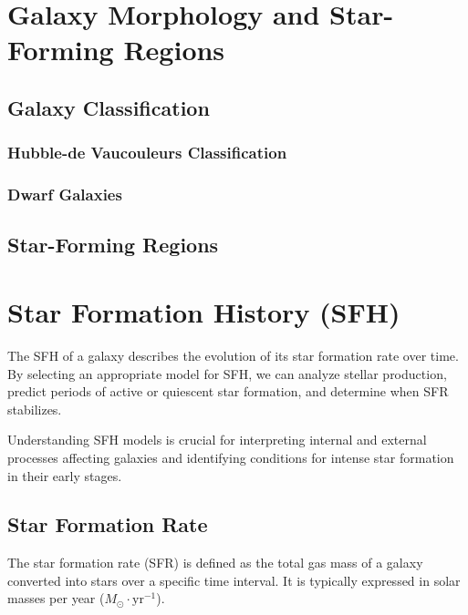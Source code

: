 \documentclass[
]{article}
\begin{document}
\newpage{}

\section{Galaxy Morphology and Star-Forming
Regions}\label{galaxy-morphology-and-star-forming-regions}

\subsection{Galaxy Classification}\label{galaxy-classification}

\subsubsection{Hubble-de Vaucouleurs
Classification}\label{hubble-de-vaucouleurs-classification}

\subsubsection{Dwarf Galaxies}\label{dwarf-galaxies}

\subsection{Star-Forming Regions}\label{star-forming-regions}

\section{Star Formation History (SFH)}\label{star-formation-history-sfh}

The SFH of a galaxy describes the evolution of its star formation rate
over time. By selecting an appropriate model for SFH, we can analyze
stellar production, predict periods of active or quiescent star
formation, and determine when SFR stabilizes.

Understanding SFH models is crucial for interpreting internal and
external processes affecting galaxies and identifying conditions for
intense star formation in their early stages.

\subsection{Star Formation Rate}\label{star-formation-rate}

The star formation rate (SFR) is defined as the total gas mass of a
galaxy converted into stars over a specific time interval. It is
typically expressed in solar masses per year
(\(M_\odot \cdot \text{yr}^{-1}\)).
\end{document}
